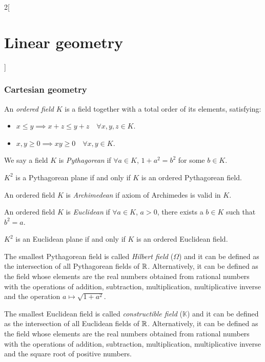\documentclass[../../../main.tex]{subfiles}
\begin{document}
\begin{multicols}{2}[\section{Linear geometry}]
  \subsubsection{Cartesian geometry}
  \begin{definition}
    An \emph{ordered field} $K$ is a field together with a total order of its elements, satisfying:
    \begin{itemize}
      \item $x\leq y\implies x+z\leq y+z\quad\forall x,y,z\in K$.
      \item $x,y\geq 0\implies xy\geq 0\quad\forall x,y\in K$.
    \end{itemize}
  \end{definition}
  \begin{definition}
    We say a field $K$ is \emph{Pythagorean} if $\forall a\in K$, $1+a^2=b^2$ for some $b\in K$.
  \end{definition}
  \begin{theorem}
    $K^2$ is a Pythagorean plane if and only if $K$ is an ordered Pythagorean field.
  \end{theorem}
  \begin{definition}
    An ordered field $K$ is \emph{Archimedean} if axiom of Archimedes is valid in $K$.
  \end{definition}
  \begin{definition}
    An ordered field $K$ is \emph{Euclidean} if $\forall a\in K$, $a>0$, there exists a $b\in K$ such that $b^2=a$.
  \end{definition}
  \begin{theorem}
    $K^2$ is an Euclidean plane if and only if $K$ is an ordered Euclidean field.
  \end{theorem}
  \begin{definition}
    The smallest Pythagorean field is called \emph{Hilbert field} ($\Omega$) and it can be defined as the intersection of all Pythagorean fields of $\mathbb{R} $. Alternatively, it can be defined as the field whose elements are the real numbers obtained from rational numbers with the operations of addition, subtraction, multiplication, multiplicative inverse and the operation $a\mapsto\sqrt{1+a^2}$.
  \end{definition}
  \begin{definition}
    The smallest Euclidean field is called \emph{constructible field} ($\mathbb{K}$) and it can be defined as the intersection of all Euclidean fields of $\mathbb{R} $. Alternatively, it can be defined as the field whose elements are the real numbers obtained from rational numbers with the operations of addition, subtraction, multiplication, multiplicative inverse and the square root of positive numbers.
  \end{definition}

\end{multicols}
\end{document}
